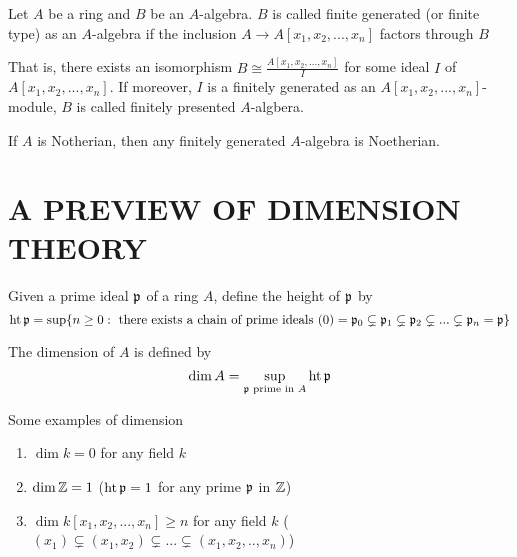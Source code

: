 \begin{definition}
	Let $A$ be a ring and $B$ be an $A$-algebra. $B$ is called finite generated (or finite type) as an $A$-algebra if the inclusion $A \to A[x_1, x_2, ..., x_n]$ factors through $B$
	\begin{center}
	\end{center}
	
	That is, there exists an isomorphism $B \cong \frac{A[x_1, x_2, ..., x_n]}{I}$ for some ideal $I$ of $A[x_1, x_2, ..., x_n]$. If moreover, $I$ is a finitely generated as an $A[x_1, x_2, ..., x_n]$-module, $B$ is called finitely presented $A$-algbera.
\end{definition}

\begin{proposition}
	If $A$ is Notherian, then any finitely generated $A$-algebra is Noetherian.
\end{proposition}

\section{A PREVIEW OF DIMENSION THEORY}

\begin{definition}
	Given a prime ideal $\mathfrak{p}$ of a ring $A$, define the height of $\mathfrak{p}$ by
	$$
	\operatorname{ht} \mathfrak{p} = \sup \{n \geq 0: \text{ there exists a chain of prime ideals } (0) = \mathfrak{p}_0 \subsetneq \mathfrak{p}_1 \subsetneq \mathfrak{p}_2 \subsetneq ... \subsetneq \mathfrak{p}_n = \mathfrak{p}\}
	$$
	
	The dimension of $A$ is defined by
	$$
	\dim A = \sup_{\mathfrak{p} \text{ prime in } A} \operatorname{ht} \mathfrak{p}
	$$
\end{definition}

\begin{remark}
	Some examples of dimension
	\begin{enumerate}
		\item $\dim k = 0$ for any field $k$
		\item $\dim \mathbb{Z} = 1$ ($\operatorname{ht} \mathfrak{p} = 1$ for any prime $\mathfrak{p}$ in $\mathbb{Z}$)
		\item $\dim k[x_1, x_2, ..., x_n] \geq n$ for any field $k$ ($(x_1) \subsetneq (x_1, x_2) \subsetneq ... \subsetneq (x_1, x_2, .., x_n)$)
	\end{enumerate}
\end{remark}

